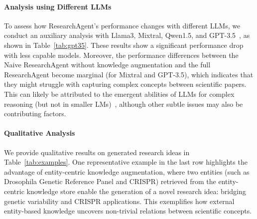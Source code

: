 \documentclass[11pt]{article}
\begin{document}
\paragraph{Analysis using Different LLMs}
To assess how ResearchAgent's performance changes with different LLMs, we conduct an auxiliary analysis with Llama3, Mixtral, Qwen1.5, and GPT-3.5~\cite{Qwen, Mixtral}, as shown in Table~\ref{tab:gpt35}. These results show a significant performance drop with less capable models. Moreover, the performance differences between the Naive ResearchAgent without knowledge augmentation and the full ResearchAgent become marginal (for Mixtral and GPT-3.5), which indicates that they might struggle with capturing complex concepts between scientific papers. This can likely be attributed to the emergent abilities of LLMs for complex reasoning (but not in smaller LMs)~\cite{Wei2022EmergentAO}, although other subtle issues may also be contributing factors.

\paragraph{Qualitative Analysis}
We provide qualitative results on generated research ideas in Table~\ref{tab:examples}. One representative example in the last row highlights the advantage of entity-centric knowledge augmentation, where two entities (such as Drosophila Genetic Reference Panel and CRISPR) retrieved from the entity-centric knowledge store enable the generation of a novel research idea: bridging genetic variability and CRISPR applications. This exemplifies how external entity-based knowledge uncovers non-trivial relations between scientific concepts.
\end{document}
